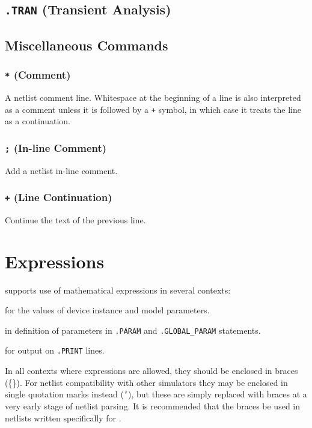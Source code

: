 \newpage
\subsection{\texttt{.TRAN} (Transient Analysis)}


\newpage
\subsection{Miscellaneous Commands}
\subsubsection{\texttt{*} (Comment)}
 A netlist comment line.  Whitespace at
the beginning of a line is also interpreted as a comment unless it
is followed by a \verb|+| symbol, in which case it treats the line as a continuation.

\subsubsection{\texttt{;} (In-line Comment)}
 Add a netlist in-line comment.

\subsubsection{\texttt{+} (Line Continuation)}
 Continue the text of the previous line.

\newpage
\section{Expressions}
\label{ExpressionDocumentation}
\Xyce{} supports use of mathematical expressions in several contexts:
\begin{XyceItemize}
\item for the values of device instance and model parameters.
\item in definition of parameters in \texttt{.PARAM} and \texttt{.GLOBAL\_PARAM} statements.
\item for output on \texttt{.PRINT} lines.
\end{XyceItemize}

In all contexts where expressions are allowed, they should be enclosed
in braces (\{\}).  For netlist compatibility with other simulators
they may be enclosed in single quotation marks instead (\texttt{'}),
but these are simply replaced with braces at a very early stage of
netlist parsing.  It is recommended that the braces be used in
netlists written specifically for \Xyce{}.

